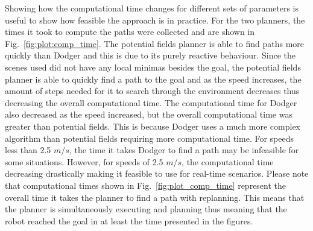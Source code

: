 Showing how the computational time changes for different sets of parameters is
useful to show how feasible the approach is in practice. For the two planners,
the times it took to compute the paths were collected and are shown in
Fig.~\ref{fig:plot:comp_time}. The potential fields planner is able to find
paths more quickly than Dodger and this is due to its purely reactive
behaviour.  Since the scenes used did not have any local minimas besides the
goal, the potential fields planner is able to quickly find a path to the goal
and as the speed increases, the amount of steps needed for it to search through
the environment decreases thus decreasing the overall computational time.  The
computational time for Dodger also decreased as the speed increased, but the
overall computational time was greater than potential fields. This is because
Dodger uses a much more complex algorithm than potential fields requiring more
computational time. For speeds less than 2.5 $m/s$, the time it takes Dodger to
find a path may be infeasible for some situations.  However, for speeds of 2.5
$m/s$, the computational time decreasing drastically making it feasible to use
for real-time scenarios.  Please note that computational times shown in
Fig.~\ref{fig:plot_comp_time} represent the overall time it takes the planner
to find a path with replanning.  This means that the planner is simultaneously
executing and planning thus meaning that the robot reached the goal in at least
the time presented in the figures.

